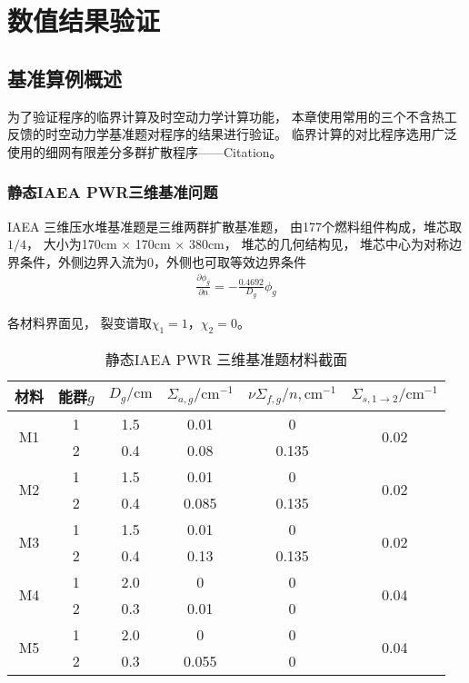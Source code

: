 

\chapter{数值结果验证}

\section{基准算例概述}

为了验证\ProgramName 程序的临界计算及时空动力学计算功能，
本章使用常用的三个不含热工反馈的时空动力学基准题对程序的结果进行验证。
临界计算的对比程序选用广泛使用的细网有限差分多群扩散程序——Citation。

\subsection{静态IAEA PWR三维基准问题}
\label{sec:result.test.iaea}

IAEA 三维压水堆基准题是三维两群扩散基准题\cite{center1977benchmark}，
由177个燃料组件构成，堆芯取$1/4$，
大小为170cm $\times$ 170cm $\times$ 380cm，
堆芯的几何结构见，
堆芯中心为对称边界条件，外侧边界入流为0，外侧也可取等效边界条件
\begin{align}
  \frac{\partial \phi_g}{\partial n}=-\frac{0.4692}{D_g}\phi_g
\end{align}

各材料界面见，
裂变谱取$\chi_1=1$，$\chi_2=0$。

\begin{table}
\centering
\caption{\label{tab:result.test.iaea.mat}静态IAEA PWR 三维基准题材料截面}
\begin{tabular}{cccccc}
\toprule
材料 & 能群$g$ & $D_g/\mathrm{cm}$ & $\Sigma_{a,g}/\mathrm{cm}^{-1}$
    & $\nu\Sigma_{f,g}/n,\mathrm{cm}^{-1}$
    & $\Sigma_{s,1\rightarrow2}/\mathrm{cm}^{-1}$\\
\midrule
\multirow{2}{*}{M1} 
  & 1 & 1.5 & 0.01 & 0 & \multirow{2}{*}{0.02} \\
  & 2 & 0.4 & 0.08 & 0.135 &\\
\multirow{2}{*}{M2} 
  & 1 & 1.5 & 0.01 & 0 & \multirow{2}{*}{0.02} \\
  & 2 & 0.4 & 0.085 & 0.135 &\\
\multirow{2}{*}{M3} 
  & 1 & 1.5 & 0.01 & 0 & \multirow{2}{*}{0.02} \\
  & 2 & 0.4 & 0.13 & 0.135 &\\
\multirow{2}{*}{M4} 
  & 1 & 2.0 & 0 & 0 & \multirow{2}{*}{0.04} \\
  & 2 & 0.3 & 0.01 & 0 &\\
\multirow{2}{*}{M5} 
  & 1 & 2.0 & 0 & 0 & \multirow{2}{*}{0.04} \\
  & 2 & 0.3 & 0.055 & 0 &\\
\bottomrule
\end{tabular}
\end{table}

